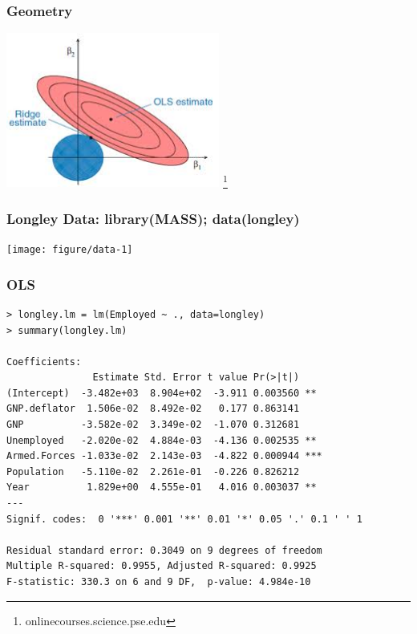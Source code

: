 \documentclass{beamer}\usepackage[]{graphicx}\usepackage[]{color}
\newenvironment{knitrout}{}{} %
\begin{document}
\begin{frame}\frametitle{Geometry}
\includegraphics[height=2in]{ridge-constraint}
\footnote{onlinecourses.science.pse.edu}
\end{frame}
\begin{frame}
  \frametitle{Longley Data:  library(MASS); data(longley)}

\vspace{-12pt}

\begin{knitrout}
\color{fgcolor}

{\centering \texttt{[image: figure/data-1]} 

}



\end{knitrout}
\end{frame}

\begin{frame}[fragile]
  \frametitle{OLS}
\begin{small}
\begin{verbatim}
> longley.lm = lm(Employed ~ ., data=longley)
> summary(longley.lm)

Coefficients:
               Estimate Std. Error t value Pr(>|t|)
(Intercept)  -3.482e+03  8.904e+02  -3.911 0.003560 **
GNP.deflator  1.506e-02  8.492e-02   0.177 0.863141
GNP          -3.582e-02  3.349e-02  -1.070 0.312681
Unemployed   -2.020e-02  4.884e-03  -4.136 0.002535 **
Armed.Forces -1.033e-02  2.143e-03  -4.822 0.000944 ***
Population   -5.110e-02  2.261e-01  -0.226 0.826212
Year          1.829e+00  4.555e-01   4.016 0.003037 **
---
Signif. codes:  0 '***' 0.001 '**' 0.01 '*' 0.05 '.' 0.1 ' ' 1

Residual standard error: 0.3049 on 9 degrees of freedom
Multiple R-squared: 0.9955,	Adjusted R-squared: 0.9925
F-statistic: 330.3 on 6 and 9 DF,  p-value: 4.984e-10
\end{verbatim}
\end{small}
\end{frame}
\end{document}
